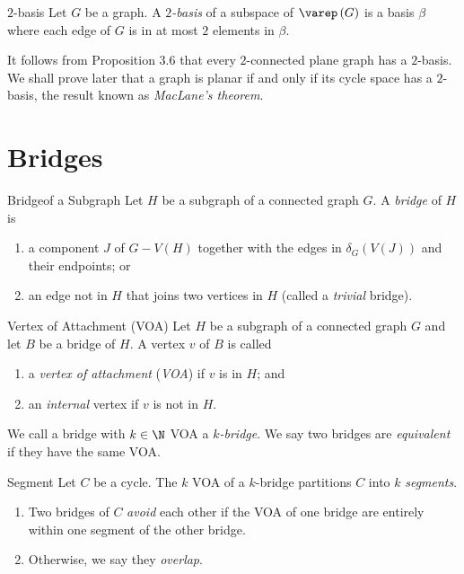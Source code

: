 \documentclass[co342]{subfiles}
\begin{document}
    \begin{definition}{$2$-basis}{}
        Let $G$ be a graph. A \emph{$2$-basis} of a subspace of $\varep\left( G \right)$ is a basis $\beta$ where each edge of $G$ is in at most $2$ elements in $\beta$.
    \end{definition}

    \np It follows from Proposition 3.6 that every $2$-connected plane graph has a $2$-basis. We shall prove later that a graph is planar if and only if its cycle space has a $2$-basis, the result known as \textit{MacLane's theorem}.

    \section{Bridges}

    \begin{definition}{Bridge}{of a Subgraph}
        Let $H$ be a subgraph of a connected graph $G$. A \emph{bridge} of $H$ is
        \begin{enumerate}
            \item a component $J$ of $G-V\left( H \right)$ together with the edges in $\delta_G\left( V\left( J \right) \right)$ and their endpoints; or
            \item an edge not in $H$ that joins two vertices in $H$ (called a \emph{trivial} bridge).
        \end{enumerate}
    \end{definition}
    
    \begin{definition}{Vertex of Attachment (VOA)}{}
        Let $H$ be a subgraph of a connected graph $G$ and let $B$ be a bridge of $H$. A vertex $v$ of $B$ is called
        \begin{enumerate}
            \item a \emph{vertex of attachment} (\emph{VOA}) if $v$ is in $H$; and
            \item an \emph{internal} vertex if $v$ is not in $H$.
        \end{enumerate}
        We call a bridge with $k\in\N$ VOA a \emph{$k$-bridge}. We say two bridges are \emph{equivalent} if they have the same VOA.
    \end{definition}
    
    \begin{definition}{Segment}{}
        Let $C$ be a cycle. The $k$ VOA of a $k$-bridge partitions $C$ into $k$ \emph{segments}. 
        \begin{enumerate}
            \item Two bridges of $C$ \emph{avoid} each other if the VOA of one bridge are entirely within one segment of the other bridge. 
            \item Otherwise, we say they \emph{overlap}.
        \end{enumerate}
    \end{definition}
\end{document}
